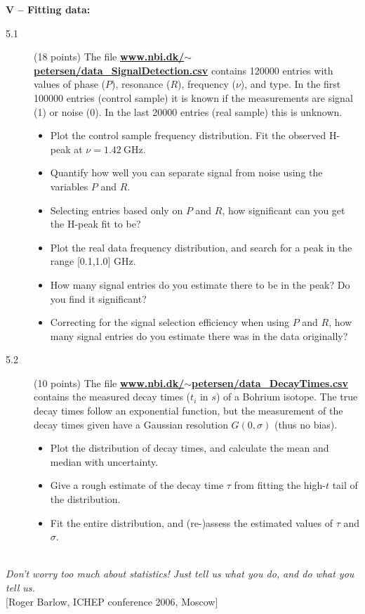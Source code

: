 \documentclass[11pt]{article}
\begin{document}
\noindent
{\bf V -- Fitting data:}
\vspace*{-1ex}
\begin{description}
\item[5.1] (18 points)
  The file \href{http://www.nbi.dk/~petersen/data\_SignalDetection.csv}{\bf www.nbi.dk/$\sim$petersen/data\_SignalDetection.csv}
  contains 120000 entries with values of phase ($P$), resonance ($R$), frequency ($\nu$), and type.
  In the first 100000 entries (control sample) it is known if the measurements are signal (1) or noise (0).
  In the last 20000 entries (real sample) this is unknown.
  \vspace*{-1ex}
  \begin{itemize}
    \item Plot the control sample frequency distribution. Fit the observed H-peak at $\nu = 1.42~\mbox{GHz}$.
    \item Quantify how well you can separate signal from noise using the variables $P$ and $R$.
    \item Selecting entries based only on $P$ and $R$, how significant can you get the H-peak fit to be?
    \item Plot the real data frequency distribution, and search for a peak in the range [0.1,1.0] GHz.
    \item How many signal entries do you estimate there to be in the peak? Do you find it significant?
    \item Correcting for the signal selection efficiency when using $P$ and $R$, how many signal entries
      do you estimate there was in the data originally?
  \end{itemize}
%
\item[5.2] (10 points)
  The file
  \href{http://www.nbi.dk/~petersen/data\_DecayTimes.csv}{\bf www.nbi.dk/$\sim$petersen/data\_DecayTimes.csv}
  contains the measured decay times ($t_i$ in $s$) of a Bohrium isotope. The true decay times follow an exponential function,
  but the measurement of the decay times given have a Gaussian resolution $G(0,\sigma)$ (thus no bias).
  \vspace*{-4ex}
  \begin{itemize}
    \item Plot the distribution of decay times, and calculate the mean and median with uncertainty.
    \item Give a rough estimate of the decay time $\tau$ from fitting the high-$t$ tail of the distribution.
    \item Fit the entire distribution, and (re-)assess the estimated values of $\tau$ and $\sigma$.
  \end{itemize}
\end{description}

\vspace*{-2ex}
\noindent
\hrulefill\\
\emph{Don't worry too much about statistics! Just tell us what you do, and do what you tell us.}\\
  \phantom{foobar} \hfill [Roger Barlow, ICHEP conference 2006, Moscow]\\[-2ex]


\end{document}
